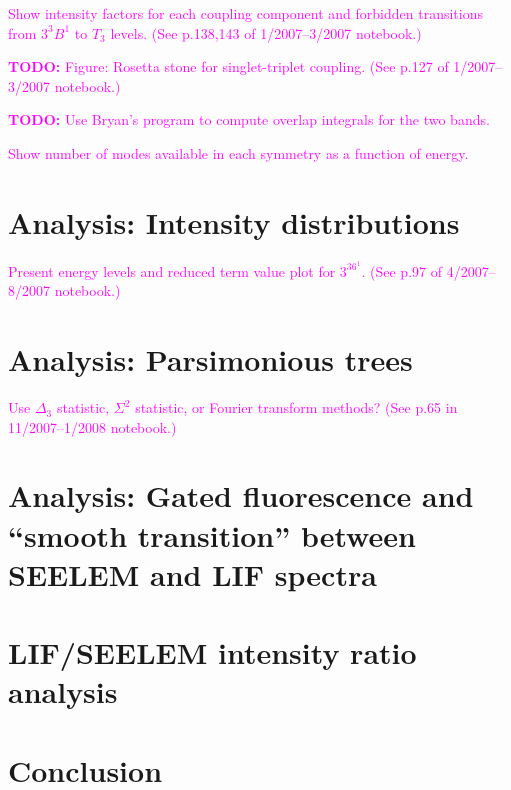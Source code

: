 \documentclass[12pt]{mitthesis}
\newcommand{\TODO} [1]{\textcolor{magenta}{\textbf{TODO:} #1}}
\newcommand{\POINT}[1]{\textcolor{magenta}{#1}}
\begin{document}
\POINT{Show intensity factors for each coupling component and
  forbidden transitions from $3^3B^1$ to $T_3$ levels.  (See p.138,143 of
  1/2007--3/2007 notebook.)}

\TODO{Figure: Rosetta stone for singlet-triplet coupling.  (See p.127
  of 1/2007--3/2007 notebook.)}

\TODO{Use Bryan's program to compute overlap integrals for the two bands.}

\POINT{Show number of modes available in each symmetry as a function
  of energy.}

\section{Analysis: Intensity distributions}

\POINT{Present energy levels and reduced term value plot for $3^36^1$.
  (See p.97 of 4/2007--8/2007 notebook.)} 

\section{Analysis: Parsimonious trees}

\POINT{Use $\Delta_3$ statistic, $\Sigma^2$ statistic, or Fourier
  transform methods? (See p.65 in 11/2007--1/2008 notebook.)}

\section{Analysis: Gated fluorescence and ``smooth transition''
  between SEELEM and LIF spectra}

\section{LIF/SEELEM intensity ratio analysis}

\section{Conclusion}
\end{document}
